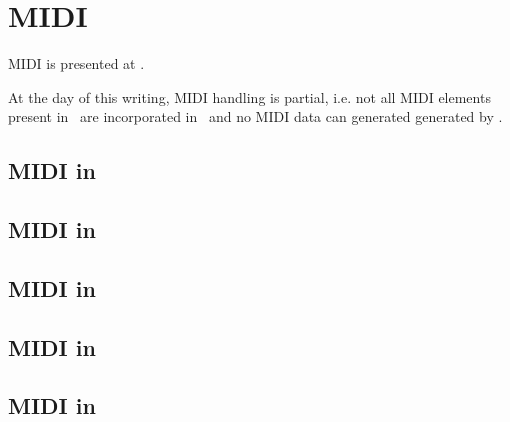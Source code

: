 



\chapter{MIDI}\label{MIDI}

MIDI is presented at .

At the day of this writing, MIDI handling is partial, i.e. not all MIDI elements present in \mxml\ are incorporated in \msrRepr\, and no MIDI data can generated generated by \mf.


\section{MIDI in \mxsrToMsr{}}


\section{MIDI in \mxsrToMsr{}}


\section{MIDI in \msrToMsr{}}


\section{MIDI in \msrToLpsr{}}


\section{MIDI in \lpsrToLilypond{}}


